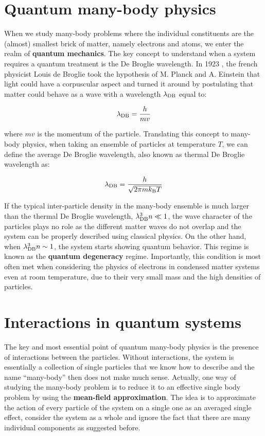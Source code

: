\section*{Quantum many-body physics}

When we study many-body problems where the individual constituents are the (almost) smallest brick of matter, namely electrons and atoms, we enter the realm of \textbf{quantum mechanics}. The key concept to understand when a system requires a quantum treatment is the De Broglie wavelength. In 1923 \cite{debroglie:tel-00006807}, the french physicist Louis de Broglie took the hypothesis of M. Planck and A. Einstein that light could have a corpuscular aspect and turned it around by postulating that matter could behave as a wave with a wavelength $\lambda_{\rm{DB}}$ equal to:

\begin{equation}
    \lambda_{\rm{DB}} = \frac{h}{mv}
\end{equation}

\noindent where $mv$ is the momentum of the particle. Translating this concept to many-body physics, when taking an ensemble of particles at temperature $T$, we can define the average De Broglie wavelength, also known as thermal De Broglie wavelength as:

\begin{equation}
    \lambda_{\rm{DB}} = \frac{h}{\sqrt{2 \pi m k_{\mathrm{B}} T}}
\end{equation}

\noindent If the typical inter-particle density in the many-body ensemble is much larger than the thermal De Broglie wavelength, \ie $\lambda_{\rm{DB}}^3 n \ll 1$, the wave character of the particles plays no role as the different matter waves do not overlap and the system can be properly described using classical physics. On the other hand, when $\lambda_{\rm{DB}}^3 n \sim 1$, the system starts showing quantum behavior. This regime is known as the \textbf{quantum degeneracy} regime. Importantly, this condition is most often met when considering the physics of electrons in condensed matter systems even at room temperature, due to their very small mass and the high densities of particles.

\section*{Interactions in quantum systems}

The key and most essential point of quantum many-body physics is the presence of interactions between the particles. Without interactions, the system is essentially a collection of single particles that we know how to describe and the name ``many-body'' then does not make much sense. Actually, one way of studying the many-body problem is to reduce it to an effective single body problem by using the \textbf{mean-field approximation}. The idea is to approximate the action of every particle of the system on a single one as an averaged single effect, \ie consider the system as a whole and ignore the fact that there are many individual components as suggested before.

